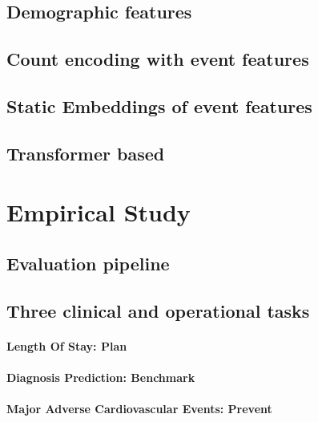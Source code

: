 \documentclass[french,12pt,twoside,a4paper]{book}
\begin{document}
\subsection{Demographic features}\label{subsec:predictive_models:demographic}

\subsection{Count encoding with event features}\label{subsec:predictive_models:count_encoding}

\subsection{Static Embeddings of event features}

\subsection{Transformer based}\label{subsec:predictive_models:transformer}

\section{Empirical Study}\label{sec:predictive_models:empirical_study}

\subsection{Evaluation pipeline}\label{subsec:predictive_models:evaluation_pipeline}

\subsection{Three clinical and operational tasks}\label{subsec:predictive_models:task_definitions}

\paragraph{Length Of Stay: Plan}

\paragraph{Diagnosis Prediction: Benchmark}

\paragraph{Major Adverse Cardiovascular Events: Prevent}
\end{document}
